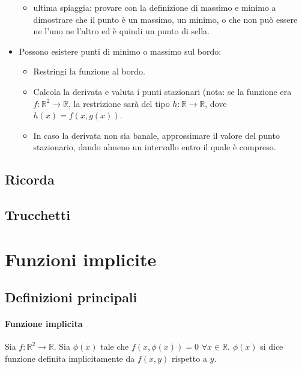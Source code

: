 \documentclass[a4paper,12pt]{book}
\begin{document}
\begin{itemize}
\begin{itemize}
\item ultima spiaggia: provare con la definizione di massimo e minimo a dimostrare che il punto è un massimo, un minimo, o che non può essere ne l'uno ne l'altro ed è quindi un punto di sella.
\end{itemize}
\item Possono esistere punti di minimo o massimo sul bordo:
\begin{itemize}
 \item Restringi la funzione al bordo.
 \item Calcola la derivata e valuta i punti stazionari (nota: se la funzione era $f: \mathbb{R}^2 \rightarrow \mathbb{R}$, la restrizione sarà del tipo $h: \mathbb{R} \rightarrow \mathbb{R}$, dove $h(x) = f(x, g(x))$.
 \item In caso la derivata non sia banale, approssimare il valore del punto stazionario, dando almeno un intervallo entro il quale è compreso.
\end{itemize}
\end{itemize}

\subsection{Ricorda}
\subsection{Trucchetti}

\section{Funzioni implicite}
\subsection{Definizioni principali}
\paragraph{Funzione implicita}
Sia $f: \mathbb{R}^2 \rightarrow \mathbb{R}$.
Sia $\phi(x)$ tale che $f(x, \phi(x)) = 0$ $\forall x \in \mathbb{R}$. $\phi(x)$ si dice funzione definita implicitamente da $f(x, y)$ rispetto a $y$.
\end{document}
